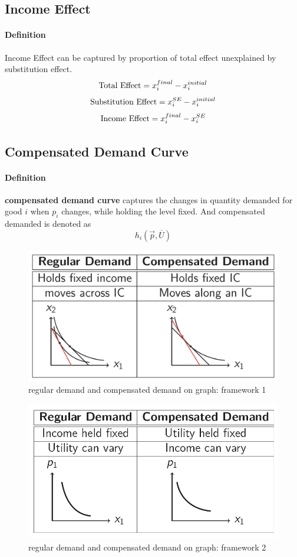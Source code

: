 \documentclass{article}
\begin{document}
		\subsection{Income Effect}
			\paragraph{Definition} Income Effect can be captured by proportion of total effect unexplained by substitution effect.
			\[
				\text{{Total Effect}} = x_i^{final} - x_i^{initial}
			\]
			\[
				\text{{Substitution Effect}} = x_i^{SE} - x_i^{initial}
			\]
			\[
				\text{{Income Effect}} = x_i^{final} - x_i^{SE}
			\]
		
		\subsection{Compensated Demand Curve}
			\paragraph{Definition} \textbf{compensated demand curve} captures the changes in quantity demanded for good $i$ when $p_i$ changes, while holding the  level fixed. And compensated demanded is denoted as
			\[
				h_i(\vec{p}, \overline{U})
			\]
			
			\begin{figure}[h]
				\centering
				\includegraphics[width=0.7\linewidth]{figure/lec5_2}
				\caption{regular demand and compensated demand on graph: framework 1}
			\end{figure}
			
			\begin{figure}[h]
				\centering
				\includegraphics[width=0.7\linewidth]{figure/lec5_3}
				\caption{regular demand and compensated demand on graph: framework 2}
			\end{figure}
		
\end{document}
